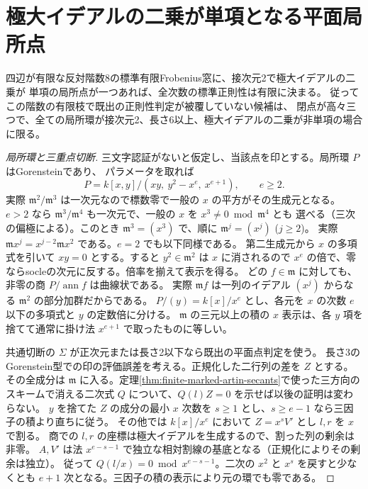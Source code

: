 \section{極大イデアルの二乗が単項となる平面局所点}
\label{sec:finite-stretched-planar-marks}
\begin{theorem}\label{thm:finite-stretched-planar-marks}
四辺が有限な反対階数8の標準有限Frobenius窓に、接次元2で極大イデアルの二乗が
単項の局所点が一つあれば、全次数の標準正則性は有限に決まる。
従ってこの階数の有限枝で既出の正則性判定が被覆していない候補は、
閉点が高々三つで、全ての局所環が接次元2、長さ6以上、極大イデアルの二乗が非単項の場合に限る。
\end{theorem}
\begin{proof}[局所環と三重点切断]
三文字認証がないと仮定し、当該点を印とする。局所環 $P$ はGorensteinであり、
パラメータを取れば
\[
 P=k[x,y]/(xy,\ y^2-x^e,\ x^{e+1}),\qquad e\ge2 .
\]
実際 $\mathfrak m^2/\mathfrak m^3$ は一次元なので標数零で一般の $x$ の平方がその生成元となる。
$e>2$ なら $\mathfrak m^3/\mathfrak m^4$ も一次元で、一般の $x$ を $x^3\ne0\bmod\mathfrak m^4$ とも
選べる（三次の偏極による）。このとき $\mathfrak m^3=(x^3)$ で、順に $\mathfrak m^j=(x^j)$ ($j\ge2$)。
実際 $\mathfrak m x^j=x^{j-2}\mathfrak m x^2$ である。$e=2$ でも以下同様である。
第二生成元から $x$ の多項式を引いて $xy=0$ とする。すると $y^2\in\mathfrak m^2$
は $x$ に消されるので $x^e$ の倍で、零ならsocleの次元に反する。倍率を揃えて表示を得る。
どの $f\in\mathfrak m$ に対しても、非零の商 $P/\operatorname{ann}f$ は曲線状である。
実際 $\mathfrak m f$ は一列のイデアル $(x^j)$ からなる $\mathfrak m^2$ の部分加群だからである。
$P/(y)=k[x]/x^e$ とし、各元を $x$ の次数 $e$ 以下の多項式と $y$ の定数倍に分ける。
$\mathfrak m$ の三元以上の積の $x$ 表示は、各 $y$ 項を捨てて通常に掛け法 $x^{e+1}$ で取ったものに等しい。

共通切断の $\Sigma$ が正次元または長さ2以下なら既出の平面点判定を使う。
長さ3のGorenstein型での印の評価誤差を考える。正規化した二行列の差を $Z$ とする。
その全成分は $\mathfrak m$ に入る。定理\ref{thm:finite-marked-artin-secants}で使った三方向の
スキームで消える二次式 $Q$ について、$Q(l) Z=0$ を示せば以後の証明は変わらない。
$y$ を捨てた $Z$ の成分の最小 $x$ 次数を $s\ge1$ とし、$s\ge e-1$ なら三因子の積より直ちに従う。
その他では $k[x]/x^e$ において $Z=x^s V'$ とし $l,r$ を $x$ で割る。
商での $l,r$ の座標は極大イデアルを生成するので、割った列の剰余は非零。
$A,V'$ は法 $x^{e-s-1}$ で独立な相対割線の基底となる（正規化によりその剰余は独立）。
従って $Q(l/x)=0\bmod x^{e-s-1}$。二次の $x^2$ と $x^s$ を戻すと少なくとも
$e+1$ 次となる。三因子の積の表示により元の環でも零である。


\end{proof}
